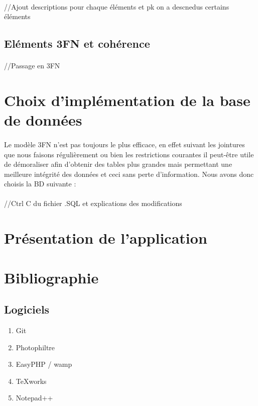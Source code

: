 \documentclass[a4paper, 12pt]{article}
\begin{document}
\paragraph{} //Ajout descriptions pour chaque éléments et pk on a descnedus certains éléments
\subsection{Eléments 3FN et cohérence}
\paragraph{} //Passage en  3FN

\newpage

\section{Choix d'implémentation de la base de données}
\paragraph{}Le modèle 3FN n'est pas toujours le plus efficace, en effet suivant les jointures que nous faisons régulièrement ou bien les restrictions courantes il peut-être utile de démoraliser afin d'obtenir des tables plus grandes mais permettant une meilleure intégrité des données et ceci sans perte d'information. Nous avons donc choisis la BD suivante :
\\ \\
//Ctrl C du fichier .SQL et explications des modifications

\newpage

\section{Présentation de l'application}


\newpage

\section{Bibliographie}
\subsection{Logiciels}
\begin{enumerate}
	\item Git
	\item Photophiltre
	\item EasyPHP / wamp
	\item TeXworks
	\item Notepad++
\end{enumerate}
\end{document}

